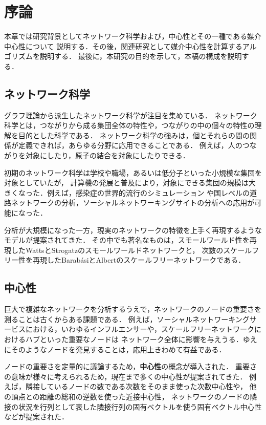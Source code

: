 \chapter{序論}
\label{chap:introduction}

本章では研究背景としてネットワーク科学および，中心性とその一種である媒介中心性について
説明する．その後，関連研究として媒介中心性を計算するアルゴリズムを説明する．
最後に，本研究の目的を示して，本稿の構成を説明する．

\section{ネットワーク科学}

グラフ理論から派生したネットワーク科学が注目を集めている．
ネットワーク科学とは，つながりから成る集団全体の特性や，つながりの中の個々の特性の理解を目的とした科学である．
ネットワーク科学の強みは，個とそれらの間の関係が定義できれば，あらゆる分野に応用できることである．
例えば，人のつながりを対象にしたり，原子の結合を対象にしたりできる．

初期のネットワーク科学は学校や職場，あるいは低分子といった小規模な集団を対象としていたが，
計算機の発展と普及により，対象にできる集団の規模は大きくなった．例えば，感染症の世界的流行のシミュレーション
や国レベルの道路ネットワークの分析，ソーシャルネットワーキングサイトの分析への応用が可能になった．

分析が大規模になった一方，現実のネットワークの特徴を上手く再現するようなモデルが提案されてきた．
その中でも著名なものは，スモールワールド性を再現したWattsとStrogatzのスモールワールドネットワーク\cite{Watts1998}と，
次数のスケールフリー性を再現したBarab{\'{a}}siとAlbertのスケールフリーネットワーク\cite{Barabasi1999}である．

\section{中心性}

巨大で複雑なネットワークを分析するうえで，ネットワークのノードの重要さを測ることは古くからある課題である．
例えば，ソーシャルネットワーキングサービスにおける，いわゆるインフルエンサーや，スケールフリーネットワークにおけるハブといった重要なノードは
ネットワーク全体に影響を与えうる．ゆえにそのようなノードを発見することは，応用上きわめて有益である．

ノードの重要さを定量的に議論するため，\textbf{中心性}の概念が導入された．
重要さの意味が様々に考えられるため，現在まで多くの中心性が提案されてきた．
例えば，隣接しているノードの数である次数をそのまま使った次数中心性や，
他の頂点との距離の総和の逆数を使った近接中心性\cite{Beauchamp1965}，
ネットワークのノードの隣接の状況を行列として表した隣接行列の固有ベクトルを使う固有ベクトル中心性
\cite{Bonacich1991}などが提案された．

